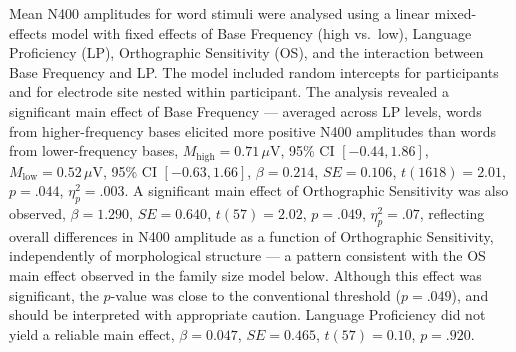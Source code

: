 \documentclass[utf8]{FrontiersinHarvard} %
\begin{document}
	Mean N400 amplitudes for word stimuli were analysed using a linear  mixed-effects model with fixed effects of Base Frequency (high vs.\  low), Language Proficiency (LP), Orthographic Sensitivity (OS), and  the interaction between Base Frequency and LP. The model included  random intercepts for participants and for electrode site nested within  participant. The analysis revealed a significant main effect of Base  Frequency --- averaged across LP levels, words from higher-frequency  bases elicited more positive N400 amplitudes than words from  lower-frequency bases, $M_{\mathrm{high}} = 0.71\,\mu$V, 95\% CI  $[-0.44, 1.86]$, $M_{\mathrm{low}} = 0.52\,\mu$V, 95\% CI $[-0.63,  1.66]$, $\beta = 0.214$, $SE = 0.106$, $t(1618) = 2.01$, $p = .044$,  $\eta^2_p = .003$. A significant main effect of Orthographic  Sensitivity was also observed, $\beta = 1.290$, $SE = 0.640$, $t(57)  = 2.02$, $p = .049$, $\eta^2_p = .07$, reflecting overall differences  in N400 amplitude as a function of Orthographic Sensitivity,  independently of morphological structure --- a pattern consistent with  the OS main effect observed in the family size model below. Although  this effect was significant, the $p$-value was close to the  conventional threshold ($p = .049$), and should be interpreted with  appropriate caution. Language Proficiency did not yield a reliable main  effect, $\beta = 0.047$, $SE = 0.465$, $t(57) = 0.10$, $p = .920$.
	
\end{document}
